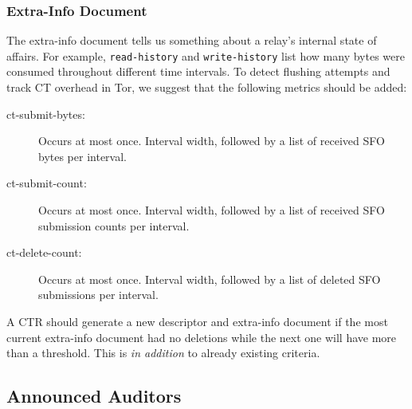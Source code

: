 \subsubsection{Extra-Info Document}
The extra-info document tells us something about a relay's internal state of
affairs.  For example, \texttt{read-history} and \texttt{write-history} list how
many bytes were consumed throughout different time intervals.  To detect
flushing attempts and track CT overhead in Tor, we suggest that the following
metrics should be added:
\begin{description}
	\item[ct-submit-bytes:] Occurs at most once.  Interval width, followed by a
		list of received SFO bytes per interval.
	\item[ct-submit-count:] Occurs at most once.  Interval width, followed by a
		list of received SFO submission counts per interval.
	\item[ct-delete-count:] Occurs at most once.  Interval width, followed by a
		list of deleted SFO submissions per interval.
\end{description}

A CTR should generate a new descriptor and extra-info document if the most
current extra-info document had no deletions while the next one will have more
than a threshold.  This is \emph{in addition} to already existing criteria.

\subsection{Announced Auditors}
